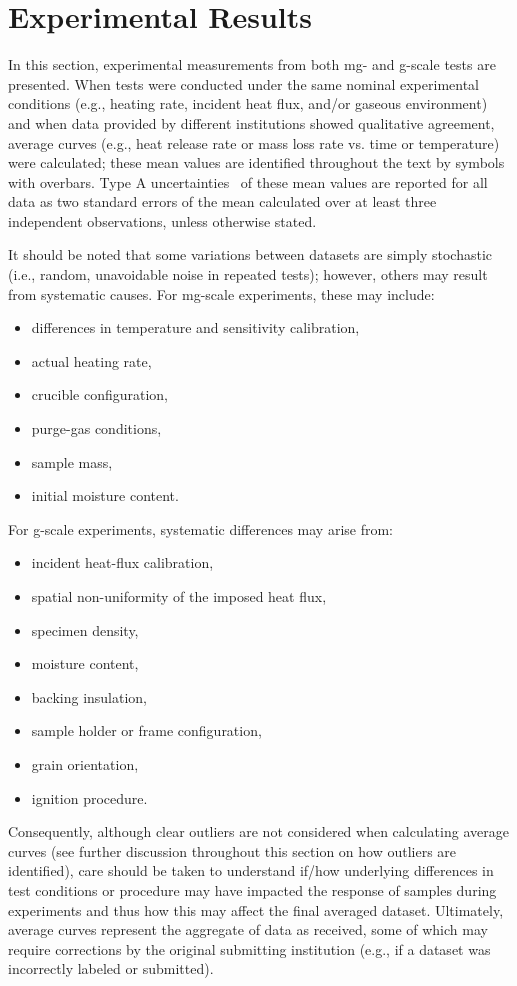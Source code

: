 \documentclass{book}
\begin{document}
\chapter{Experimental Results}
\label{exp_results}
In this section, experimental measurements from both mg- and g-scale tests are presented. When tests were conducted under the same nominal experimental conditions (e.g., heating rate, incident heat flux, and/or gaseous environment) and when data provided by different institutions showed qualitative agreement, average curves (e.g., heat release rate or mass loss rate vs. time or temperature) were calculated; these mean values are identified throughout the text by symbols with overbars. Type A uncertainties~\cite{taylor1994nist} of these mean values are reported for all data as two standard errors of the mean calculated over at least three independent observations, unless otherwise stated.

It should be noted that some variations between datasets are simply stochastic (i.e., random, unavoidable noise in repeated tests); however, others may result from systematic causes.
For mg-scale experiments, these may include:
\begin{itemize}\itemsep0pt
    \item differences in temperature and sensitivity calibration,
    \item actual heating rate,
    \item crucible configuration,
    \item purge-gas conditions,
    \item sample mass,
    \item initial moisture content.
\end{itemize}
\noindent
For g-scale experiments, systematic differences may arise from:
\begin{itemize}\itemsep0pt
    \item incident heat-flux calibration,
    \item spatial non-uniformity of the imposed heat flux,
    \item specimen density,
    \item moisture content,
    \item backing insulation,
    \item sample holder or frame configuration,
    \item grain orientation,
    \item ignition procedure.
\end{itemize}
\noindent
Consequently, although clear outliers are not considered when calculating average curves (see further discussion throughout this section on how outliers are identified), care should be taken to understand if/how underlying differences in test conditions or procedure may have impacted the response of samples during experiments and thus how this may affect the final averaged dataset. Ultimately, average curves represent the aggregate of data as received, some of which may require corrections by the original submitting institution (e.g., if a dataset was incorrectly labeled or submitted).
\end{document}
